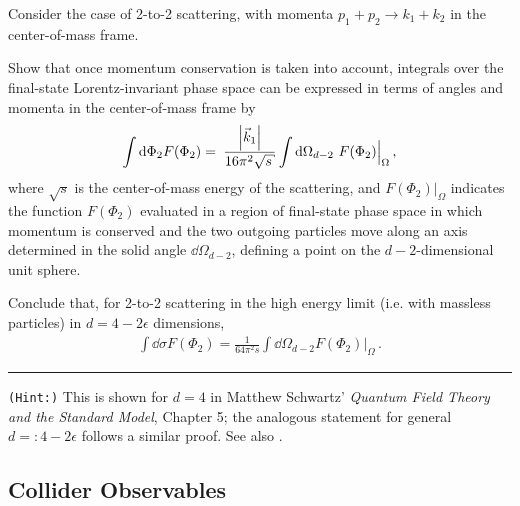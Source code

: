 \begin{exercise}
    \label{ex:two-to-two-xsec}
    Consider the case of 2-to-2 scattering, with momenta \(p_1 + p_2 \to k_1 + k_2\) in the center-of-mass frame.

    Show that once momentum conservation is taken into account, integrals over the final-state Lorentz-invariant phase space can be expressed in terms of angles and momenta in the center-of-mass frame by
%
    \begin{align}
        \int \dd\Phi_2
        F(\Phi_2)
        =
        \frac{}{}
        \frac{\abs{\vec{k}_1}}{16 \pi^2 \sqrt{s}}
        \int \dd\Omega_{d-2}
        \,\,
        F(\Phi_2)\Big|_\Omega
        \,,
    \end{align}
    where \(\sqrt{s}\) is the center-of-mass energy of the scattering, and \(F(\Phi_2)\Big|_\Omega\) indicates the function \(F(\Phi_2)\) evaluated in a region of final-state phase space in which momentum is conserved and the two outgoing particles move along an axis determined in the solid angle \(\dd \Omega_{d-2}\), defining a point on the \(d-2\)-dimensional unit sphere.

    Conclude that, for 2-to-2 scattering in the high energy limit (i.e. with massless particles) in \(d = 4-2\epsilon\) dimensions,
%
    \begin{align}
        \int
        \dd \sigma F(\Phi_2)
        =
        \frac{1}{64\pi^2 s}
        \int \dd\Omega_{d-2} F(\Phi_2)\Big|_\Omega
        \,.
    \end{align}


    \vspace{7pt}
    \hrule
    \vspace{7pt}

    \texttt{(Hint:)}
    This is shown for \(d=4\) in Matthew Schwartz' \textit{Quantum Field Theory and the Standard Model}, Chapter 5;
    the analogous statement for general \(d =: 4-2\epsilon\) follows a similar proof.
    See also \Reff{}.
\end{exercise}


\subsection{Collider Observables}
\label{sec:observables}

